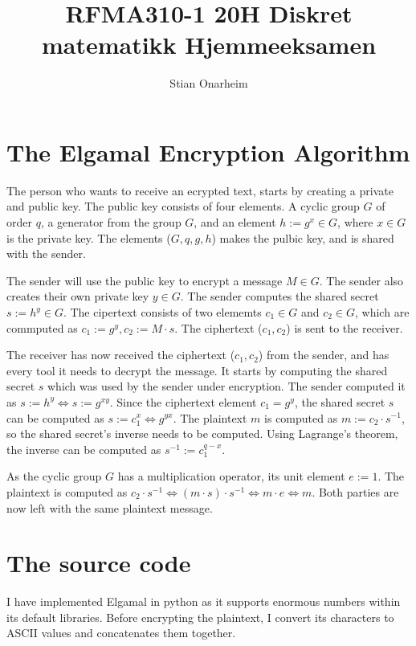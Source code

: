 \documentclass{article}
\author{Stian Onarheim}
\title{RFMA310-1 20H Diskret matematikk Hjemmeeksamen}
\begin{document}
\maketitle
\newpage
\tableofcontents
\newpage

\section{The Elgamal Encryption Algorithm}
The person who wants to receive an ecrypted text, starts by creating a private and public key. The public key consists of four elements. A cyclic group $G$ of order $q$, a generator from the group $G$, and an element $h := g^x \in G$, where $x \in G$ is the private key. The elements ($G, q, g, h$) makes the pulbic key, and is shared with the sender.

The sender will use the public key to encrypt a message $M \in G$. The sender also creates their own private key $y \in G$. The sender computes the shared secret $s := h^y \in G$. The cipertext consists of two elememts $c_1 \in G$ and $c_2 \in G$, which are commputed as $c_1 := g^y, c_2 := M \cdot s$. The ciphertext ($c_1,c_2$) is sent to the receiver.

The receiver has now received the ciphertext ($c_1, c_2$) from the sender, and has every tool it needs to decrypt the message. It starts by computing the shared secret $s$ which was used by the sender under encryption. The sender computed it as $s := h^y \Leftrightarrow s:= g^{xy}$. Since the ciphertext element $c_1 = g^y$, the shared secret $s$ can be computed as $s := c_1^x \Leftrightarrow g^{yx}$. The plaintext $m$ is computed as $m := c_2 \cdot s^{-1}$, so the shared secret's inverse needs to be computed. Using Lagrange's theorem, the inverse can be computed as $s^{-1} := c_1^{q-x}$.

As the cyclic group $G$ has a multiplication operator, its unit element $e := 1$. The plaintext is computed as $c_2 \cdot s^{-1} \Leftrightarrow (m \cdot s) \cdot s^{-1} \Leftrightarrow m \cdot e \Leftrightarrow m$. Both parties are now left with the same plaintext message.

\section{The source code}
I have implemented Elgamal in python as it supports enormous numbers within its default libraries. Before encrypting the plaintext, I convert its characters to ASCII values and concatenates them together.\\
\end{document}

